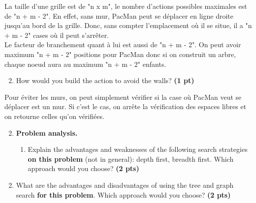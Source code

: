 \documentclass[11pt,a4paper]{../template/report}
\begin{document}
\begin{answer}
La taille d'une grille est de "n x m", le nombre d'actions possibles maximales est de "n + m - 2". En effet, sans mur, PacMan peut se déplacer en ligne droite jusqu'au bord de la grille. Donc, sans compter l'emplacement où il se situe, il a "n + m - 2" cases où il peut s'arrêter. \\
Le facteur de branchement quant à lui est aussi de "n + m - 2". On peut avoir maximum "n + m - 2" positions pour PacMan donc si on construit un arbre, chaque noeud aura au maximum "n + m - 2" enfants.
\end{answer}
\begin{enumerate}
\setcounter{enumi}{1}
\begin{enumerate}
\setcounter{enumii}{1}
    \item  How would you build the action to avoid the walls? \textbf{(1 pt)}
\end{enumerate}
  
\end{enumerate}

\begin{answer}
Pour éviter les murs, on peut simplement vérifier si la case où PacMan veut se déplacer est un mur. Si c'est le cas, on arrête la vérification des espaces libres et on retourne celles qu'on vérifiées.
\end{answer}



\begin{enumerate}
\setcounter{enumi}{1}
    \item \textbf{Problem analysis.}
    \begin{enumerate}
        \item Explain the advantages and weaknesses of the following search strategies \textbf{on this problem} (not in general): depth first, breadth first. Which approach would you choose? \textbf{(2 pts)}
    \end{enumerate}
\end{enumerate}

\begin{answer}
\end{answer}



\begin{enumerate}
\setcounter{enumi}{1}
\begin{enumerate}
\setcounter{enumii}{1}
    \item What are the advantages and disadvantages of using the tree and graph search \textbf{for this problem}. Which approach would you choose? \textbf{(2 pts)}
\end{enumerate}
\end{enumerate}
\end{document}
